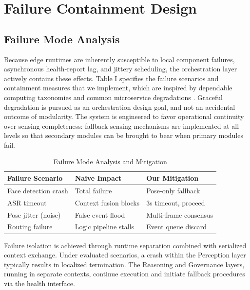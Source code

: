 \documentclass[conference]{IEEEtran}
\begin{document}
\section{Failure Containment Design}

\subsection{Failure Mode Analysis}
Because edge runtimes are inherently susceptible to local component failures, asynchronous health-report lag, and jittery scheduling, the orchestration layer actively contains these effects. Table I specifies the failure scenarios and containment measures that we implement, which are inspired by dependable computing taxonomies \cite{b18} and common microservice degradations \cite{b24}. Graceful degradation is pursued as an orchestration design goal, and not an accidental outcome of modularity. The system is engineered to favor operational continuity over sensing completeness: fallback sensing mechanisms are implemented at all levels so that secondary modules can be brought to bear when primary modules fail.

\begin{table}[htbp]
\caption{Failure Mode Analysis and Mitigation}
\begin{center}
\begin{tabular}{lll}
\toprule
\textbf{Failure Scenario} & \textbf{Naive Impact} & \textbf{Our Mitigation} \\
\midrule
Face detection crash & Total failure & Pose-only fallback \\
ASR timeout & Context fusion blocks & 3s timeout, proceed \\
Pose jitter (noise) & False event flood & Multi-frame consensus \\
Routing failure & Logic pipeline stalls & Event queue discard \\
\bottomrule
\end{tabular}
\end{center}
\end{table}

Failure isolation is achieved through runtime separation combined with serialized context exchange. Under evaluated scenarios, a crash within the Perception layer typically results in localized termination. The Reasoning and Governance layers, running in separate contexts, continue execution and initiate fallback procedures via the health interface.
\end{document}
